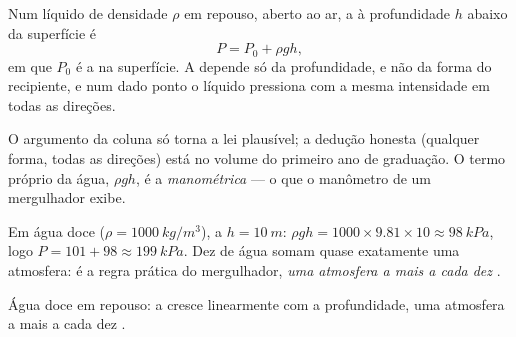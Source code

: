 \begin{theorem}\label{thm:g10:pressure:depth}
Num líquido de densidade $\rho$ em repouso, aberto ao ar, a  à
profundidade $h$ abaixo da superfície é
\[
P = P_0 + \rho g h,
\]
em que $P_0$ é a  na superfície. A  depende só
da profundidade, e não da forma do recipiente, e num dado ponto o líquido
pressiona com a mesma intensidade em todas as direções.
\end{theorem}
\admitted

\begin{remark}
O argumento da coluna só torna a lei plausível; a dedução honesta
(qualquer forma, todas as direções) está no volume do primeiro ano de
graduação. O termo próprio da água, $\rho g h$, é a 
\emph{manométrica} --- o que o manômetro de um
mergulhador exibe.
\end{remark}

\begin{example}\label{ex:g10:pressure:tenmetres}
Em água doce ($\rho = \qty{1000}{kg/m^3}$), a $h = \qty{10}{m}$:
$\rho g h = 1000 \times 9.81 \times 10 \approx \qty{98}{kPa}$, logo
$P = 101 + 98 \approx \qty{199}{kPa}$. Dez  de água somam quase
exatamente uma atmosfera: é a regra prática do mergulhador, \emph{uma
atmosfera a mais a cada dez }.
\end{example}

\begin{omfigure}

{\small Água doce em repouso: a  cresce linearmente com a
profundidade, uma atmosfera a mais a cada dez .}
\end{omfigure}

